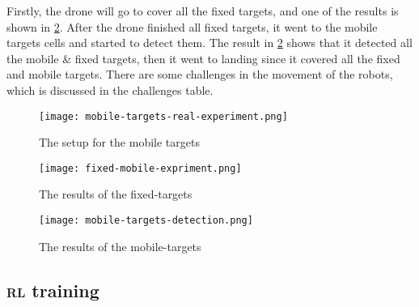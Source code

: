 \documentclass[../main.tex]{subfiles}
\begin{document}
Firstly, the drone will go to cover all the fixed targets, and one of the 
results is shown in \cref{fig:fixed-mobile-expriment}. After the 
drone finished all fixed targets, it went to the mobile targets cells and
started to detect them. The result in \cref{fig:fixed-mobile-expriment} 
shows that it detected all the mobile \& fixed targets, 
then it went to landing since it covered all the fixed and mobile targets.
There are some challenges in the movement of the robots, which is 
discussed in the challenges table.


\begin{figure}[H]
	\centering
	\texttt{[image: mobile-targets-real-experiment.png]}
	\caption{The setup for the mobile targets}
	\label{fig:mobile-targets-real-experiment}
\end{figure}

\begin{figure}[H]
	\centering
	\texttt{[image: fixed-mobile-expriment.png]}
	\caption{The results of the fixed-targets}
	\label{fig:fixed-mobile-expriment}
\end{figure}

\begin{figure}[H]
	\centering
	\texttt{[image: mobile-targets-detection.png]}
	\caption{The results of the mobile-targets}
	\label{fig:mobile-expriment-detection}
\end{figure}

\subsection{\textsc{rl} training}
\end{document}

